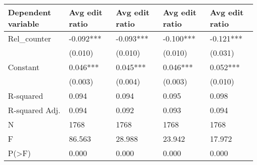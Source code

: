 \begin{tabular}{lllll}
\toprule
Dependent variable & Avg edit ratio & Avg edit ratio & Avg edit ratio & Avg edit ratio \\
\midrule
Rel\_counter    &      -0.092*** &      -0.093*** &      -0.100*** &      -0.121*** \\
               &        (0.010) &        (0.010) &        (0.010) &        (0.031) \\
Constant       &       0.046*** &       0.045*** &       0.046*** &       0.052*** \\
               &        (0.003) &        (0.004) &        (0.003) &        (0.010) \\
R-squared      &          0.094 &          0.094 &          0.095 &          0.098 \\
R-squared Adj. &          0.094 &          0.092 &          0.093 &          0.094 \\
N              &           1768 &           1768 &           1768 &           1768 \\
F              &         86.563 &         28.988 &         23.942 &         17.972 \\
P(>F)          &          0.000 &          0.000 &          0.000 &          0.000 \\
\bottomrule
\end{tabular}
